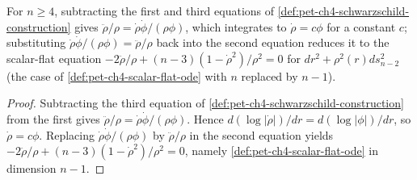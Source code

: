 \begin{proposition}
  \label{prop:pet-ch4-schwarzschild-reduces-scalar-flat}


  For $n\ge4$, subtracting the first and third equations of
  \cref{def:pet-ch4-schwarzschild-construction} gives
  $\ddot\rho/\rho=\dot\rho\dot\phi/(\rho\phi)$, which integrates to
  $\dot\rho=c\phi$ for a constant $c$; substituting
  $\dot\rho\dot\phi/(\rho\phi)=\ddot\rho/\rho$ back into the second equation
  reduces it to the scalar-flat equation
  $-2\ddot\rho/\rho+(n-3)(1-\dot\rho^2)/\rho^2=0$ for $dr^2+\rho^2(r)ds_{n-2}^2$
  (the case of \cref{def:pet-ch4-scalar-flat-ode} with $n$ replaced by $n-1$).
\end{proposition}
\begin{proof}

  \sketch
  Subtracting the third equation of
  \cref{def:pet-ch4-schwarzschild-construction} from the first gives
  $\ddot\rho/\rho=\dot\rho\dot\phi/(\rho\phi)$. Hence
  $d(\log|\dot\rho|)/dr=d(\log|\phi|)/dr$, so $\dot\rho=c\phi$. Replacing
  $\dot\rho\dot\phi/(\rho\phi)$ by $\ddot\rho/\rho$ in the second equation
  yields
  $-2\ddot\rho/\rho+(n-3)(1-\dot\rho^2)/\rho^2=0$, namely
  \cref{def:pet-ch4-scalar-flat-ode} in dimension $n-1$.
\end{proof}


